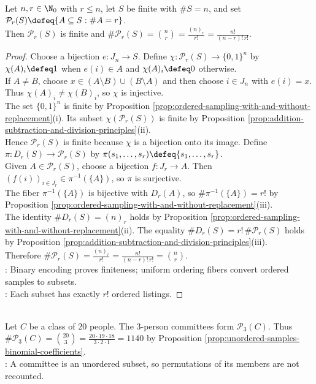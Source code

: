 \begin{proposition} \label{prop:unordered-samples-binomial-coefficients} \\
Let $n,r\in\N_0$ with $r\leq n$, let $S$ be finite with $\#S=n$, and set $\mathcal{P}_r(S)\defeq\{A\subseteq S:\#A=r\}$.\\
Then $\mathcal{P}_r(S)$ is finite and $\#\mathcal{P}_r(S)=\binom{n}{r}=\frac{(n)_r}{r!}=\frac{n!}{(n-r)!\,r!}$.
\begin{proof}
Choose a bijection $e:J_n\to S$. Define $\chi:\mathcal{P}_r(S)\to\{0,1\}^n$ by $\chi(A)_i\defeq1$ when $e(i)\in A$ and $\chi(A)_i\defeq0$ otherwise.\\
If $A\neq B$, choose $x\in(A\setminus B)\cup(B\setminus A)$ and then choose $i\in J_n$ with $e(i)=x$. Thus $\chi(A)_i\neq\chi(B)_i$, so $\chi$ is injective.\\
The set $\{0,1\}^n$ is finite by Proposition \ref{prop:ordered-sampling-with-and-without-replacement}(i). Its subset $\chi(\mathcal{P}_r(S))$ is finite by Proposition \ref{prop:addition-subtraction-and-division-principles}(ii).\\
Hence $\mathcal{P}_r(S)$ is finite because $\chi$ is a bijection onto its image. Define $\pi:D_r(S)\to\mathcal{P}_r(S)$ by $\pi(s_1,\ldots,s_r)\defeq\{s_1,\ldots,s_r\}$.\\
Given $A\in\mathcal{P}_r(S)$, choose a bijection $f:J_r\to A$. Then $(f(i))_{i\in J_r}\in\pi^{-1}(\{A\})$, so $\pi$ is surjective.\\
The fiber $\pi^{-1}(\{A\})$ is bijective with $D_r(A)$, so $\#\pi^{-1}(\{A\})=r!$ by Proposition \ref{prop:ordered-sampling-with-and-without-replacement}(iii).\\
The identity $\#D_r(S)=(n)_r$ holds by Proposition \ref{prop:ordered-sampling-with-and-without-replacement}(ii). The equality $\#D_r(S)=r!\,\#\mathcal{P}_r(S)$ holds by Proposition \ref{prop:addition-subtraction-and-division-principles}(iii).\\
Therefore $\#\mathcal{P}_r(S)=\frac{(n)_r}{r!}=\frac{n!}{(n-r)!\,r!}=\binom{n}{r}$.\\
: Binary encoding proves finiteness; uniform ordering fibers convert ordered samples to subsets.\\
: Each subset has exactly $r!$ ordered listings.
\end{proof}
\end{proposition}

\begin{example} \label{ex:committee-binomial-coefficient} \\
Let $C$ be a class of $20$ people. The $3$-person committees form $\mathcal{P}_3(C)$. Thus $\#\mathcal{P}_3(C)=\binom{20}{3}=\frac{20\cdot19\cdot18}{3\cdot2\cdot1}=1140$ by Proposition \ref{prop:unordered-samples-binomial-coefficients}.\\
: A committee is an unordered subset, so permutations of its members are not recounted.\\
\end{example}

